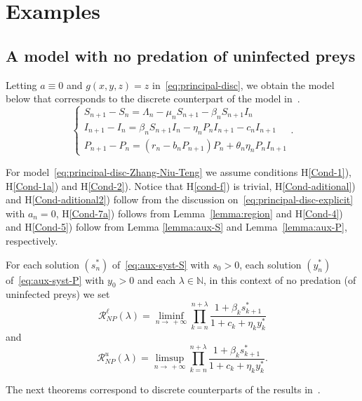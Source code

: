 \documentclass[reqno]{amsart}
\newcommand{\cR}{\mathcal R}
\newcommand{\N}{\ensuremath{\mathds N}}
\begin{document}
{{\section{Examples}\label{sec3}

\subsection{A model with no predation of uninfected preys}

Letting $a \equiv 0$ and $g(x,y,z)=z$ in~\eqref{eq:principal-disc}, we obtain the model below that corresponds to the discrete counterpart of the model in~\cite{Niu-Zhang-Teng-AMM-2011}.
\begin{equation}\label{eq:principal-disc-Zhang-Niu-Teng}
\begin{cases}
S_{n+1}-S_n=\Lambda_n-\mu_nS_{n+1}-\beta_nS_{n+1}I_n\\
I_{n+1}-I_n=\beta_nS_{n+1}I_n-\eta_nP_nI_{n+1}-c_nI_{n+1}\\
P_{n+1}-P_n=(r_n-b_nP_{n+1})P_n+\theta_n\eta_nP_nI_{n+1}
\end{cases}.
\end{equation}

For model~\eqref{eq:principal-disc-Zhang-Niu-Teng} we assume conditions H\ref{Cond-1}), H\ref{Cond-1a}) and H\ref{Cond-2}). Notice that H\ref{cond-f}) is trivial,  H\ref{Cond-aditional}) and H\ref{Cond-aditional2}) follow from the discussion on~\eqref{eq:principal-disc-explicit} with $a_n=0$, H\ref{Cond-7a}) follows from Lemma~\ref{lemma:region} and H\ref{Cond-4}) and  H\ref{Cond-5}) follow from Lemma \ref{lemma:aux-S} and Lemma~\ref{lemma:aux-P}, respectively.



For each solution $(s_n^*)$ of~\eqref{eq:aux-syst-S} with $s_0>0$, each solution $(y_n^*)$ of~\eqref{eq:aux-syst-P} with $y_0>0$ and each $\lambda \in \N$, in this context of no predation (of uninfected preys) we set
\[
\cR_{NP}^\ell(\lambda) = \liminf_{n \to \, +\infty} \prod_{k=n}^{n+\lambda} \dfrac{1+\beta_ks^*_{k+1}}{1+c_k+\eta_ky^*_k}
\]
and
\[
\cR_{NP}^u(\lambda) = \limsup_{n \to \, +\infty} \prod_{k=n}^{n+\lambda} \dfrac{1+\beta_ks^*_{k+1}}{1+c_k+\eta_ky^*_k}.
\]


The next theorems correspond to discrete counterparts of the results in~\cite{Niu-Zhang-Teng-AMM-2011}.

}}
\end{document}
